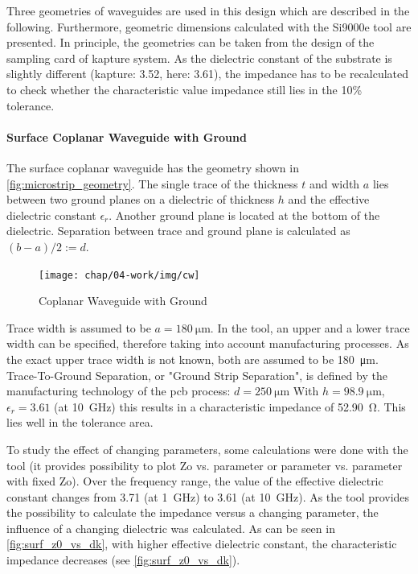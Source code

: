 Three geometries of waveguides are used in this design which are described in the following. Furthermore, geometric dimensions calculated with the Si9000e tool are presented. In principle, the geometries can be taken from the design of the sampling card of \gls{kapture} system. As the dielectric constant of the substrate is slightly different (\gls{kapture}: 3.52, here: 3.61), the impedance has to be recalculated to check whether the characteristic value impedance still lies in the 10\% tolerance.
\paragraph{Surface Coplanar Waveguide with Ground}
The surface coplanar waveguide has the geometry shown in \autoref{fig:microstrip_geometry}. The single trace of the thickness $t$ and width $a$ lies between two ground planes on a dielectric of thickness $h$ and the effective dielectric constant $\epsilon_r$. Another ground plane is located at the bottom of the dielectric. Separation between trace and ground plane is calculated as $(b-a)/2 := d$. 

\begin{figure}[!htbp]
	\centering
	\texttt{[image: chap/04-work/img/cw]}
	\caption{Coplanar Waveguide with Ground}
	\label{fig:microstrip_geometry}
\end{figure}

Trace width is assumed to be $a = \SI{180}{\micro \meter}$. In the tool, an upper and a lower trace width can be specified, therefore taking into account manufacturing processes. As the exact upper trace width is not known, both are assumed to be  \SI{180}{\micro \meter}.   Trace-To-Ground Separation, or "Ground Strip Separation", is defined by the manufacturing technology of the \gls{pcb} process: $d = \SI{250}{\micro \meter}$ With $h = \SI{98.9}{\micro \meter}$, $\epsilon_r = 3.61$ (at \SI{10}{\giga \hertz}) this results in a characteristic impedance of \SI{52.90}{\ohm}. This lies well in the tolerance area.

To study the effect of changing parameters, some calculations were done with the tool (it provides possibility to plot Zo vs. parameter or parameter vs. parameter with fixed Zo).
Over the frequency range, the value of the effective dielectric constant changes from 3.71 (at \SI{1}{\giga \hertz}) to 3.61 (at \SI{10}{\giga \hertz}). As the tool provides the possibility to calculate the impedance versus a changing parameter, the influence of a changing dielectric was calculated. As can be seen in \autoref{fig:surf_z0_vs_dk}, with higher effective dielectric constant, the characteristic impedance decreases (see \autoref{fig:surf_z0_vs_dk}).

